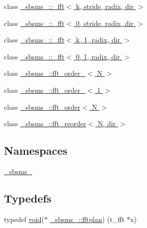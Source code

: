 \begin{DoxyCompactItemize}
\item 
class \hyperlink{class__sbsms___1_1__fft}{\+\_\+sbsms\+\_\+\+::\+\_\+fft$<$ k, stride, radix, dir $>$}
\item 
class \hyperlink{class__sbsms___1_1__fft_3_010_00_01stride_00_01radix_00_01dir_01_4}{\+\_\+sbsms\+\_\+\+::\+\_\+fft$<$ 0, stride, radix, dir $>$}
\item 
class \hyperlink{class__sbsms___1_1__fft_3_01k_00_011_00_01radix_00_01dir_01_4}{\+\_\+sbsms\+\_\+\+::\+\_\+fft$<$ k, 1, radix, dir $>$}
\item 
class \hyperlink{class__sbsms___1_1__fft_3_010_00_011_00_01radix_00_01dir_01_4}{\+\_\+sbsms\+\_\+\+::\+\_\+fft$<$ 0, 1, radix, dir $>$}
\item 
class \hyperlink{class__sbsms___1_1fft__order__}{\+\_\+sbsms\+\_\+\+::fft\+\_\+order\+\_\+$<$ N $>$}
\item 
class \hyperlink{class__sbsms___1_1fft__order___3_011_01_4}{\+\_\+sbsms\+\_\+\+::fft\+\_\+order\+\_\+$<$ 1 $>$}
\item 
class \hyperlink{class__sbsms___1_1fft__order}{\+\_\+sbsms\+\_\+\+::fft\+\_\+order$<$ N $>$}
\item 
class \hyperlink{class__sbsms___1_1fft__reorder}{\+\_\+sbsms\+\_\+\+::fft\+\_\+reorder$<$ N, dir $>$}
\end{DoxyCompactItemize}
\subsection*{Namespaces}
\begin{DoxyCompactItemize}
\item 
 \hyperlink{namespace__sbsms__}{\+\_\+sbsms\+\_\+}
\end{DoxyCompactItemize}
\subsection*{Typedefs}
\begin{DoxyCompactItemize}
\item 
typedef \hyperlink{sound_8c_ae35f5844602719cf66324f4de2a658b3}{void}($\ast$ \hyperlink{namespace__sbsms___a7f1d3311b2efc8799b5c4bf22942e197}{\+\_\+sbsms\+\_\+\+::fftplan}) (t\+\_\+fft $\ast$x)
\end{DoxyCompactItemize}
